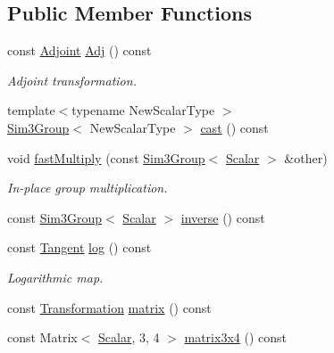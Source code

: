 \subsection*{Public Member Functions}
\begin{DoxyCompactItemize}
\item 
const \hyperlink{class_sophus_1_1_sim3_group_base_a7aa93f325ac7b811db77652f488e8f03}{Adjoint} \hyperlink{class_sophus_1_1_sim3_group_base_ab68ea48a89f018d3d298001a51cd6b95}{Adj} () const 
\begin{DoxyCompactList}\small\item\em Adjoint transformation. \end{DoxyCompactList}\item 
{\footnotesize template$<$typename New\+Scalar\+Type $>$ }\\\hyperlink{class_sophus_1_1_sim3_group}{Sim3\+Group}$<$ New\+Scalar\+Type $>$ \hyperlink{class_sophus_1_1_sim3_group_base_afb710f8ef8ee6f6168dea80fe119d131}{cast} () const 
\item 
void \hyperlink{class_sophus_1_1_sim3_group_base_a83dfde5b319dc9055f5723d29a45ed89}{fast\+Multiply} (const \hyperlink{class_sophus_1_1_sim3_group}{Sim3\+Group}$<$ \hyperlink{class_sophus_1_1_sim3_group_base_abcf3d57b9fcc425bbc367a85a45a8092}{Scalar} $>$ \&other)
\begin{DoxyCompactList}\small\item\em In-\/place group multiplication. \end{DoxyCompactList}\item 
const \hyperlink{class_sophus_1_1_sim3_group}{Sim3\+Group}$<$ \hyperlink{class_sophus_1_1_sim3_group_base_abcf3d57b9fcc425bbc367a85a45a8092}{Scalar} $>$ \hyperlink{class_sophus_1_1_sim3_group_base_a21debb906ffbeda23394fbddea8f3acd}{inverse} () const 
\item 
const \hyperlink{class_sophus_1_1_sim3_group_base_a0f61582b6d8fa46ecbb40d70c87b632c}{Tangent} \hyperlink{class_sophus_1_1_sim3_group_base_ae8417db9c9a27c4a99955561062d48fc}{log} () const 
\begin{DoxyCompactList}\small\item\em Logarithmic map. \end{DoxyCompactList}\item 
const \hyperlink{class_sophus_1_1_sim3_group_base_a93c8c564e3386709dc4cb2fc6d451dd8}{Transformation} \hyperlink{class_sophus_1_1_sim3_group_base_a4cce2bd5ded85614bedd1e13b7efe494}{matrix} () const 
\item 
const Matrix$<$ \hyperlink{class_sophus_1_1_sim3_group_base_abcf3d57b9fcc425bbc367a85a45a8092}{Scalar}, 3, 4 $>$ \hyperlink{class_sophus_1_1_sim3_group_base_a7894ea86d497e4dee880e669817e3146}{matrix3x4} () const 

\end{DoxyCompactItemize}
